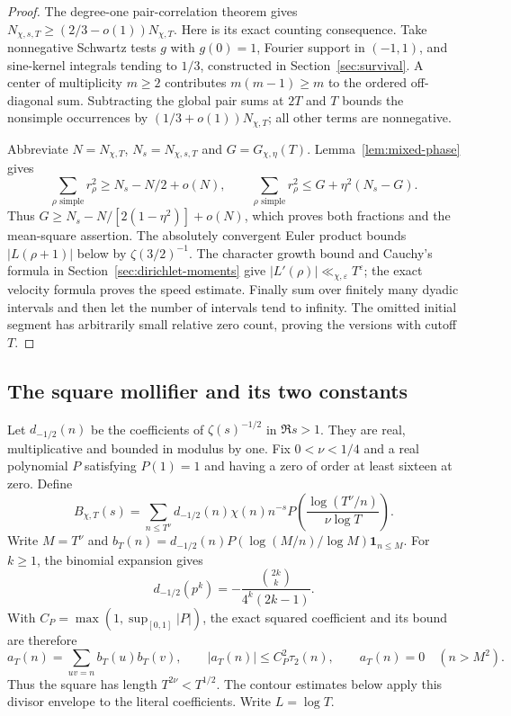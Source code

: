 \begin{proof}
The degree-one pair-correlation theorem
\cite[Theorems~1.1--1.2]{rudnick-sarnak} gives
$N_{\chi,s,T}\ge(2/3-o(1))N_{\chi,T}$.
Here is its exact counting consequence. Take nonnegative
Schwartz tests $g$ with $g(0)=1$, Fourier support in $(-1,1)$,
and sine-kernel integrals tending to $1/3$, constructed in
Section~\ref{sec:survival}. A center of multiplicity $m\ge2$
contributes $m(m-1)\ge m$ to the ordered off-diagonal sum.
Subtracting the global pair sums at $2T$ and $T$ bounds the
nonsimple occurrences by $(1/3+o(1))N_{\chi,T}$; all other
terms are nonnegative.

Abbreviate $N=N_{\chi,T}$, $N_s=N_{\chi,s,T}$ and $G=G_{\chi,\eta}(T)$.
Lemma~\ref{lem:mixed-phase} gives
\[
 \sum_{\rho\text{ simple}}r_\rho^2
       \ge N_s-N/2+o(N),\qquad
 \sum_{\rho\text{ simple}}r_\rho^2
       \le G+\eta^2(N_s-G).
\]
Thus $G\ge N_s-N/[2(1-\eta^2)]+o(N)$, which proves
both fractions and the mean-square assertion. The absolutely
convergent Euler product bounds $|L(\rho+1)|$ below by
$\zeta(3/2)^{-1}$. The character growth bound and Cauchy's
formula in Section~\ref{sec:dirichlet-moments} give
$|L'(\rho)|\ll_{\chi,\varepsilon}T^\varepsilon$;
the exact velocity formula proves the speed estimate.
Finally sum over finitely many dyadic intervals and then let
the number of intervals tend to infinity. The omitted initial
segment has arbitrarily small relative zero count, proving
the versions with cutoff $T$.
\end{proof}

\subsection{The square mollifier and its two constants}
Let $d_{-1/2}(n)$ be the coefficients of $\zeta(s)^{-1/2}$ in
$\Re s>1$. They are real, multiplicative and bounded in modulus by
one. Fix $0<\nu<1/4$ and a real polynomial $P$ satisfying $P(1)=1$
and having a zero of order at least sixteen at zero. Define
\[
 B_{\chi,T}(s)=\sum_{n\le T^\nu}d_{-1/2}(n)\chi(n)n^{-s}
                 P\left(\frac{\log(T^\nu/n)}{\nu\log T}\right).
\]
Write $M=T^\nu$ and
$b_T(n)=d_{-1/2}(n)P(\log(M/n)/\log M)\mathbf1_{n\le M}$.
For $k\ge1$, the binomial expansion gives
\[
 d_{-1/2}(p^k)=-\frac{\binom{2k}{k}}{4^k(2k-1)}.
\]
With $C_P=\max(1,\sup_{[0,1]}|P|)$, the exact squared coefficient
and its bound are therefore
\[
 a_T(n)=\sum_{uv=n}b_T(u)b_T(v),\qquad
 |a_T(n)|\le C_P^2\tau_2(n),\qquad a_T(n)=0\quad(n>M^2).
\]
Thus the square has length $T^{2\nu}<T^{1/2}$. The contour estimates
below apply this divisor envelope to the literal coefficients.
Write $L=\log T$.

